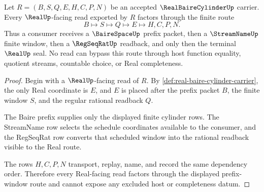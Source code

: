 \begin{theorem}\label{thm:real-baire-cylinder-stream-real-handoff}
Let $R=(B,S,Q,E,H,C,P,N)$ be an accepted $\RealBaireCylinderUp$ carrier. Every $\RealUp$-facing read exported by $R$ factors through the finite route
$$
B \longmapsto S \longmapsto Q \longmapsto E \longmapsto H,C,P,N .
$$
Thus a consumer receives a $\BaireSpaceUp$ prefix packet, then a $\StreamNameUp$ finite window, then a $\RegSeqRatUp$ readback, and only then the terminal $\RealUp$ seal. No read can bypass this route through host function equality, quotient streams, countable choice, or Real completeness.
\end{theorem}
\begin{proof}
Begin with a $\RealUp$-facing read of $R$. By \autoref{def:real-baire-cylinder-carrier}, the only Real coordinate is $E$, and $E$ is placed after the prefix packet $B$, the finite window $S$, and the regular rational readback $Q$.

The Baire prefix supplies only the displayed finite cylinder rows. The StreamName row selects the schedule coordinates available to the consumer, and the RegSeqRat row converts that scheduled window into the rational readback visible to the Real route.

The rows $H,C,P,N$ transport, replay, name, and record the same dependency order. Therefore every Real-facing read factors through the displayed prefix-window route and cannot expose any excluded host or completeness datum.
\end{proof}




